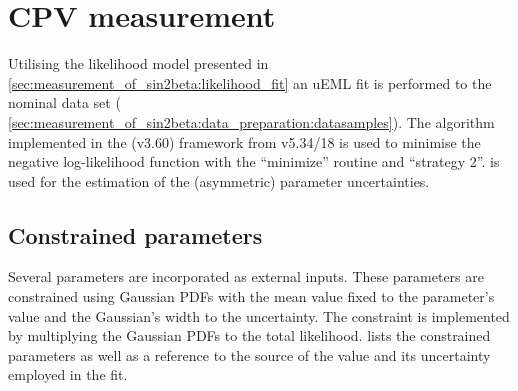 
\section{CPV measurement}
\label{sec:measurement_of_sin2beta:cpv_measurement}

Utilising the likelihood model presented in
\cref{sec:measurement_of_sin2beta:likelihood_fit} an \ac{uEML} fit is performed
to the nominal data set (\cf
\cref{sec:measurement_of_sin2beta:data_preparation:datasamples}).  The
\MinuitTwo algorithm implemented in the \RooFit (v3.60) framework from \ROOT
v5.34/18 is used to minimise the negative log-likelihood function with the
\enquote{minimize} routine and \enquote{strategy 2}. \Minos is used for the
estimation of the (asymmetric) parameter uncertainties.

\subsection{Constrained parameters}
\label{sec:measurement_of_sin2beta:cpv_measurement:constrained_parameters}

Several parameters are incorporated as external inputs. These parameters are
constrained using Gaussian \acp{PDF} with the mean value fixed to the
parameter's value and the Gaussian's width to the uncertainty. The constraint is
implemented by multiplying the Gaussian \acp{PDF} to the total likelihood.
 lists
the constrained parameters as well as a reference to the source of the value and
its uncertainty employed in the fit.

